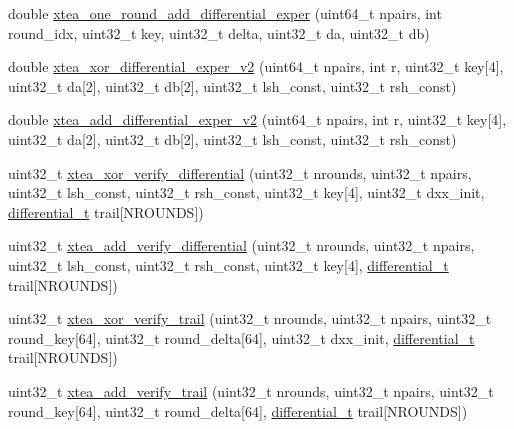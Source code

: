 \begin{DoxyCompactItemize}
\item 
double \hyperlink{xtea_8hh_a6dd7767959e2f83e37288a2d57ce442e}{xtea\-\_\-one\-\_\-round\-\_\-add\-\_\-differential\-\_\-exper} (uint64\-\_\-t npairs, int round\-\_\-idx, uint32\-\_\-t key, uint32\-\_\-t delta, uint32\-\_\-t da, uint32\-\_\-t db)
\item 
double \hyperlink{xtea_8hh_a299b87136574de5ce7a8770bfd63b848}{xtea\-\_\-xor\-\_\-differential\-\_\-exper\-\_\-v2} (uint64\-\_\-t npairs, int r, uint32\-\_\-t key\mbox{[}4\mbox{]}, uint32\-\_\-t da\mbox{[}2\mbox{]}, uint32\-\_\-t db\mbox{[}2\mbox{]}, uint32\-\_\-t lsh\-\_\-const, uint32\-\_\-t rsh\-\_\-const)
\item 
double \hyperlink{xtea_8hh_abded4986f72882b62af4f6d5fc4b63ce}{xtea\-\_\-add\-\_\-differential\-\_\-exper\-\_\-v2} (uint64\-\_\-t npairs, int r, uint32\-\_\-t key\mbox{[}4\mbox{]}, uint32\-\_\-t da\mbox{[}2\mbox{]}, uint32\-\_\-t db\mbox{[}2\mbox{]}, uint32\-\_\-t lsh\-\_\-const, uint32\-\_\-t rsh\-\_\-const)
\item 
uint32\-\_\-t \hyperlink{xtea_8hh_ab9472e66d992ae81a3d5204e448412da}{xtea\-\_\-xor\-\_\-verify\-\_\-differential} (uint32\-\_\-t nrounds, uint32\-\_\-t npairs, uint32\-\_\-t lsh\-\_\-const, uint32\-\_\-t rsh\-\_\-const, uint32\-\_\-t key\mbox{[}4\mbox{]}, uint32\-\_\-t dxx\-\_\-init, \hyperlink{structdifferential__t}{differential\-\_\-t} trail\mbox{[}\-N\-R\-O\-U\-N\-D\-S\mbox{]})
\item 
uint32\-\_\-t \hyperlink{xtea_8hh_a87ccf2cd69df0d545729e08e5e582190}{xtea\-\_\-add\-\_\-verify\-\_\-differential} (uint32\-\_\-t nrounds, uint32\-\_\-t npairs, uint32\-\_\-t lsh\-\_\-const, uint32\-\_\-t rsh\-\_\-const, uint32\-\_\-t key\mbox{[}4\mbox{]}, \hyperlink{structdifferential__t}{differential\-\_\-t} trail\mbox{[}\-N\-R\-O\-U\-N\-D\-S\mbox{]})
\item 
uint32\-\_\-t \hyperlink{xtea_8hh_a96e3e55f034ab5c150ee59d7e96a2483}{xtea\-\_\-xor\-\_\-verify\-\_\-trail} (uint32\-\_\-t nrounds, uint32\-\_\-t npairs, uint32\-\_\-t round\-\_\-key\mbox{[}64\mbox{]}, uint32\-\_\-t round\-\_\-delta\mbox{[}64\mbox{]}, uint32\-\_\-t dxx\-\_\-init, \hyperlink{structdifferential__t}{differential\-\_\-t} trail\mbox{[}\-N\-R\-O\-U\-N\-D\-S\mbox{]})
\item 
uint32\-\_\-t \hyperlink{xtea_8hh_aa70fdbe5d05c841589c28618b6db069a}{xtea\-\_\-add\-\_\-verify\-\_\-trail} (uint32\-\_\-t nrounds, uint32\-\_\-t npairs, uint32\-\_\-t round\-\_\-key\mbox{[}64\mbox{]}, uint32\-\_\-t round\-\_\-delta\mbox{[}64\mbox{]}, \hyperlink{structdifferential__t}{differential\-\_\-t} trail\mbox{[}\-N\-R\-O\-U\-N\-D\-S\mbox{]})
\end{DoxyCompactItemize}


